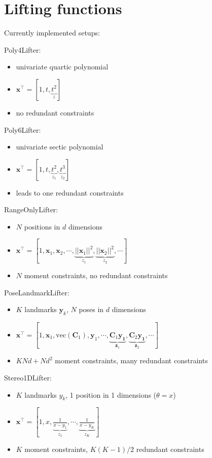 \documentclass[11pt]{article}
\providecommand{\tightlist}{%
  \setlength{\itemsep}{0pt}\setlength{\parskip}{0pt}}
\newcommand{\vc}[1]{\ensuremath{\bm{#1}}}
\begin{document}
\section{Lifting functions}

Currently implemented setups:

Poly4Lifter:

\begin{itemize}
\tightlist
\item univariate quartic polynomial
\item \(\vc{x}^\top = [1, t, \underbrace{t^2}_{z}]\)
\item no redundant constraints
\end{itemize}

Poly6Lifter:
\begin{itemize}
\tightlist
\item univariate sectic polynomial
\item \(\vc{x}^\top = [1, t, \underbrace{t^2}_{z_1}, \underbrace{t^3}_{z_2}]\)
\item leads to one redundant constraints
\end{itemize}

RangeOnlyLifter:

\begin{itemize}
\tightlist
\item \(N\) positions in \(d\) dimensions
\item \(\vc{x}^\top = [1, \vc{x}_1, \vc{x}_2, \cdots , \underbrace{||\vc{x}_1||^2}_{z_1}, \underbrace{||\vc{x}_2||^2}_{z_2}, \cdots]\)
\item \(N\) moment constraints, no redundant constraints
\end{itemize}

PoseLandmarkLifter:

\begin{itemize}
\tightlist
\item \(K\) landmarks \(\vc{y}_k\), \(N\) poses in \(d\) dimensions
\item \(\vc{x}^\top = [1, \vc{x}_1, \text{vec}(\vc{C}_1), \vc{y}_1, \cdots , \underbrace{\vc{C}_1\vc{y_1}}_{\vc{z}_1}, \underbrace{\vc{C}_2\vc{y_1}}_{\vc{z}_2}, \cdots]\)
\item \(KNd + Nd^2\) moment constraints, many redundant constraints
\end{itemize}

Stereo1DLifter:

\begin{itemize}
\tightlist
\item \(K\) landmarks \(y_k\), 1 position in 1 dimensions (\(\theta=x\))
\item \(\vc{x}^\top = [1, x, \underbrace{\frac{1}{x-y_1}}_{z_1}, \cdots, \underbrace{\frac{1}{x-y_K}}_{z_K}]\) 
\item \(K\) moment constraints, \(K(K-1)/2\) redundant constraints
\end{itemize}
\end{document}
